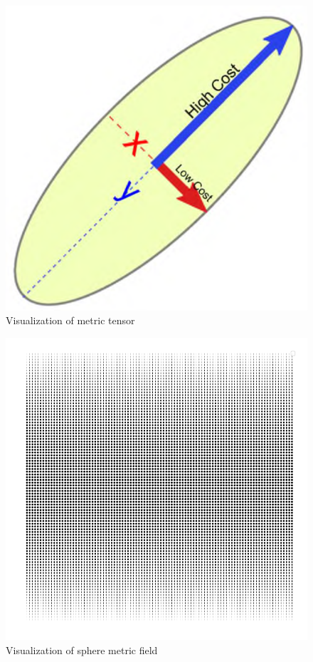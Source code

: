 \documentclass[a4paper]{article}
\theoremstyle{definition}
\theoremstyle{plain}
\begin{document}
\begin{figure}[H]
    \label{fig:metricinellipse}
    \centering
    \includegraphics[scale=0.3]{figure/metricinellipse.png}
    \caption{Visualization of metric tensor}
\end{figure}

\begin{figure}[H]
    \label{fig:spheremetrictensor}
    \centering
    \includegraphics[scale=0.25]{figure/spheremetrictensor.png}
    \caption{Visualization of sphere metric field}
\end{figure}
\end{document}
